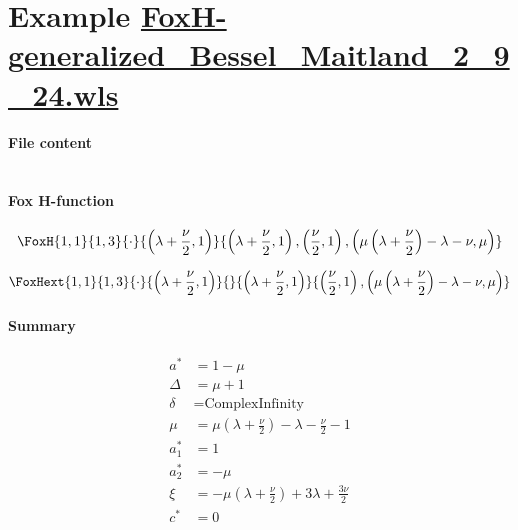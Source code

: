 \documentclass[11pt]{article}
\begin{document}
\section{Example \url{FoxH-generalized_Bessel_Maitland_2_9_24.wls}}

\paragraph{File content}

\inputminted{text}{FoxH-generalized_Bessel_Maitland_2_9_24.wls}

\paragraph{Fox H-function}

\begin{align*}
  \FoxH
    {1,1}
    {1,3}
    {\cdot}
    {\left(\lambda +\frac{\nu }{2}, 1\right)}
    {\left(\lambda +\frac{\nu }{2}, 1\right), \left(\frac{\nu }{2}, 1\right), \left(\mu \left(\lambda +\frac{\nu }{2}\right)-\lambda -\nu, \mu\right)}
\end{align*}

\begin{align*}
  \FoxHext
    {1,1}
    {1,3}
    {\cdot}
    {\left(\lambda +\frac{\nu }{2}, 1\right)}
    {}
    {\left(\lambda +\frac{\nu }{2}, 1\right)}
    {\left(\frac{\nu }{2}, 1\right), \left(\mu \left(\lambda +\frac{\nu }{2}\right)-\lambda -\nu, \mu\right)}
\end{align*}

\paragraph{Summary}

\begin{align*}
  a^*    & = 1-\mu \\
  \Delta & = \mu +1 \\
  \delta & = \text{ComplexInfinity} \\
  \mu    & = \mu \left(\lambda +\frac{\nu }{2}\right)-\lambda -\frac{\nu }{2}-1 \\
  a_1^*  & = 1 \\
  a_2^*  & = -\mu \\
  \xi    & = -\mu \left(\lambda +\frac{\nu }{2}\right)+3 \lambda +\frac{3 \nu }{2} \\
  c^*    & = 0 \\
\end{align*}
\end{document}
